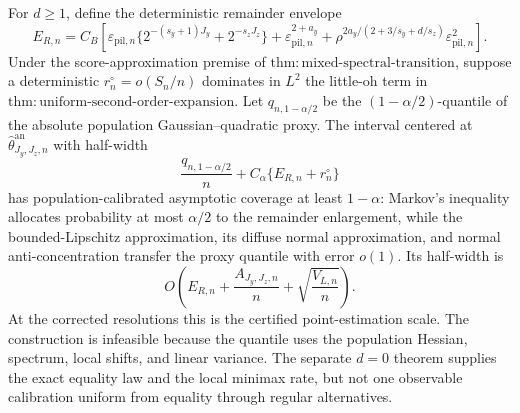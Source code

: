 For \(d\ge1\), define the deterministic remainder envelope
\[
E_{R,n}=C_B\left[
\varepsilon_{\mathrm{pil},n}\{2^{-(s_y+1)J_y}+2^{-s_zJ_z}\}
+\varepsilon_{\mathrm{pil},n}^{2+a_y}
+\rho^{2a_y/(2+3/s_y+d/s_z)}\varepsilon_{\mathrm{pil},n}^2
\right].
\]
Under the score-approximation premise of \(\mathrm{thm{:}mixed\text{-}spectral\text{-}transition}\), suppose a deterministic \(r_n^\circ=o(S_n/n)\) dominates in \(L^2\) the little-oh term in \(\mathrm{thm{:}uniform\text{-}second\text{-}order\text{-}expansion}\).  Let \(q_{n,1-\alpha/2}\) be the \((1-\alpha/2)\)-quantile of the absolute population Gaussian--quadratic proxy.  The interval centered at \(\widehat\theta^{\mathrm{an}}_{J_y,J_z,n}\) with half-width
\[
\frac{q_{n,1-\alpha/2}}{n}+C_\alpha\{E_{R,n}+r_n^\circ\}
\]
has population-calibrated asymptotic coverage at least \(1-\alpha\): Markov's inequality allocates probability at most \(\alpha/2\) to the remainder enlargement, while the bounded-Lipschitz approximation, its diffuse normal approximation, and normal anti-concentration transfer the proxy quantile with error \(o(1)\).  Its half-width is
\[
O\!\left(E_{R,n}+\frac{A_{J_y,J_z,n}}n+\sqrt{\frac{V_{L,n}}n}\right).
\]
At the corrected resolutions this is the certified point-estimation scale.  The construction is infeasible because the quantile uses the population Hessian, spectrum, local shifts, and linear variance.  The separate \(d=0\) theorem supplies the exact equality law and the local minimax rate, but not one observable calibration uniform from equality through regular alternatives.